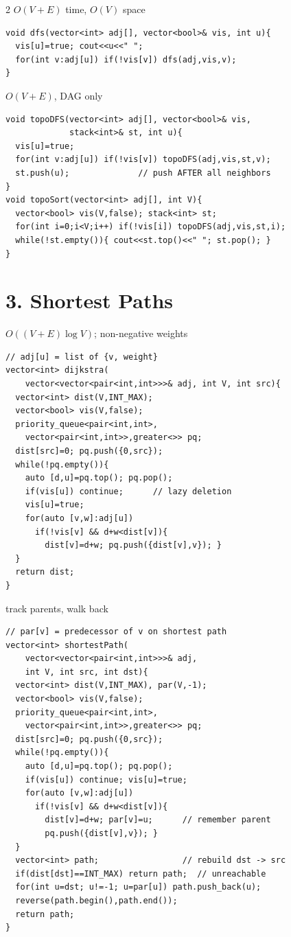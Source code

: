 \documentclass[12pt,landscape,a4paper]{extarticle}
\newcommand{\algo}[2]{\vspace{1pt}{\bfseries #1}\hfill{\footnotesize\color{cx}#2}\par\vspace{-1pt}}
\begin{document}
\begin{multicols}{2}
\algo{DFS (Recursive)}{$O(V+E)$ time, $O(V)$ space}
\begin{lstlisting}
void dfs(vector<int> adj[], vector<bool>& vis, int u){
  vis[u]=true; cout<<u<<" ";
  for(int v:adj[u]) if(!vis[v]) dfs(adj,vis,v);
}
\end{lstlisting}

\algo{Topological Sort (DFS)}{$O(V+E)$, DAG only}
\begin{lstlisting}
void topoDFS(vector<int> adj[], vector<bool>& vis,
             stack<int>& st, int u){
  vis[u]=true;
  for(int v:adj[u]) if(!vis[v]) topoDFS(adj,vis,st,v);
  st.push(u);              // push AFTER all neighbors
}
void topoSort(vector<int> adj[], int V){
  vector<bool> vis(V,false); stack<int> st;
  for(int i=0;i<V;i++) if(!vis[i]) topoDFS(adj,vis,st,i);
  while(!st.empty()){ cout<<st.top()<<" "; st.pop(); }
}
\end{lstlisting}

\section*{3. Shortest Paths}

\algo{Dijkstra (SSSP)}{$O((V{+}E)\log V)$; non-negative weights}
\begin{lstlisting}
// adj[u] = list of {v, weight}
vector<int> dijkstra(
    vector<vector<pair<int,int>>>& adj, int V, int src){
  vector<int> dist(V,INT_MAX);
  vector<bool> vis(V,false);
  priority_queue<pair<int,int>,
    vector<pair<int,int>>,greater<>> pq;
  dist[src]=0; pq.push({0,src});
  while(!pq.empty()){
    auto [d,u]=pq.top(); pq.pop();
    if(vis[u]) continue;      // lazy deletion
    vis[u]=true;
    for(auto [v,w]:adj[u])
      if(!vis[v] && d+w<dist[v]){
        dist[v]=d+w; pq.push({dist[v],v}); }
  }
  return dist;
}
\end{lstlisting}

\algo{Dijkstra --- Path Reconstruction}{track parents, walk back}
\begin{lstlisting}
// par[v] = predecessor of v on shortest path
vector<int> shortestPath(
    vector<vector<pair<int,int>>>& adj,
    int V, int src, int dst){
  vector<int> dist(V,INT_MAX), par(V,-1);
  vector<bool> vis(V,false);
  priority_queue<pair<int,int>,
    vector<pair<int,int>>,greater<>> pq;
  dist[src]=0; pq.push({0,src});
  while(!pq.empty()){
    auto [d,u]=pq.top(); pq.pop();
    if(vis[u]) continue; vis[u]=true;
    for(auto [v,w]:adj[u])
      if(!vis[v] && d+w<dist[v]){
        dist[v]=d+w; par[v]=u;      // remember parent
        pq.push({dist[v],v}); }
  }
  vector<int> path;                 // rebuild dst -> src
  if(dist[dst]==INT_MAX) return path;  // unreachable
  for(int u=dst; u!=-1; u=par[u]) path.push_back(u);
  reverse(path.begin(),path.end());
  return path;
}
\end{lstlisting}


\end{multicols}
\end{document}
